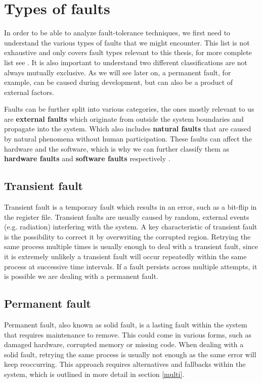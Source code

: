 \section{Types of faults}

In order to be able to analyze fault-tolerance techniques, we first need to understand the various types of faults that we might encounter. This list is not exhaustive and only covers fault types relevant to this thesis, for more complete list see \cite{1335465}. It is also important to understand two different classifications are not always mutually exclusive. As we will see later on, a permanent fault, for example, can be caused during development, but can also be a product of external factors.

Faults can be further split into various categories, the ones mostly relevant to us are \textbf{external faults} which originate from outside the system boundaries and propagate into the system. Which also includes \textbf{natural faults} that are caused by natural phenomena without human participation. These faults can affect the hardware and the software, which is why we can further classify them as \textbf{hardware faults} and \textbf{software faults} respectively \cite{1335465}. \\

\subsection{Transient fault} 
Transient fault is a temporary fault which results in an error, such as a bit-flip in the register file. Transient faults are usually caused by random, external events (e.g. radiation) interfering with the system. A key characteristic of transient fault is the possibility to correct it by overwriting the corrupted region. Retrying the same process multiple times is usually enough to deal with a transient fault, since it is extremely unlikely a transient fault will occur repeatedly within the same process at successive time intervals. If a fault persists across multiple attempts, it is possible we are dealing with a permanent fault. \\

\subsection{Permanent fault} 
Permanent fault, also known as solid fault, is a lasting fault within the system that requires maintenance to remove. This could come in various forms, such as damaged hardware, corrupted memory or missing code. When dealing with a solid fault, retrying the same process is usually not enough as the same error will keep reoccurring. This approach requires alternatives and fallbacks within the system, which is outlined in more detail in section \ref{multi}. \\

